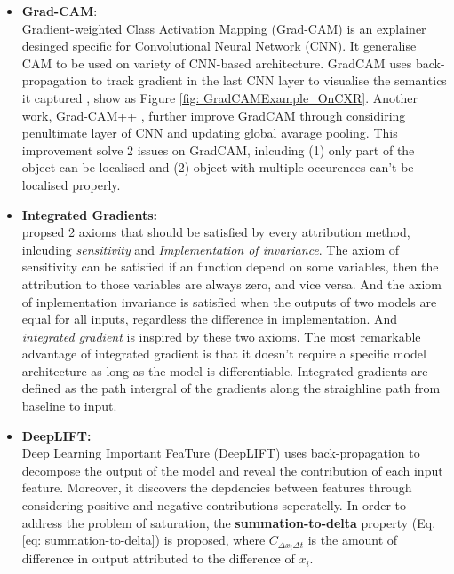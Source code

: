 \begin{itemize}
    \item \textbf{Grad-CAM}: \\ Gradient-weighted Class Activation Mapping (Grad-CAM) is an explainer desinged specific for Convolutional Neural Network (CNN). It generalise CAM \citep{Zhou2015CAM} to be used on variety of CNN-based architecture. GradCAM uses back-propagation to track gradient in the last CNN layer to visualise the semantics it captured \citep{Selvaraju2017GradCAM}, show as Figure \ref{fig: GradCAMExample_OnCXR}. Another work, Grad-CAM++ \citep{Chattopadhay2018GradCAM}, further improve GradCAM through considiring penultimate layer of CNN and updating global avarage pooling. This improvement solve 2 issues on GradCAM, inlcuding (1) only part of the object can be localised and (2) object with multiple occurences can't be localised properly.
    \item \textbf{Integrated Gradients:} \\ \citet{Sundararajan2017IntegratedGradient} propsed 2 axioms that should be satisfied by every attribution method, inlcuding \textit{sensitivity} and \textit{Implementation of invariance}. The axiom of sensitivity can be satisfied if an function depend on some variables, then the attribution to those variables are always zero, and vice versa. And the axiom of inplementation invariance is satisfied when the outputs of two models are equal for all inputs, regardless the difference in implementation. And \textit{integrated gradient} is inspired by these two axioms. The most remarkable advantage of integrated gradient is that it doesn't require a specific model architecture as long as the model is differentiable. Integrated gradients are defined as the path intergral of the gradients along the straighline path from baseline to input.
    \item \textbf{DeepLIFT:} \\ Deep Learning Important FeaTure (DeepLIFT) \citep{Shrikumar2017DeepLIFT} uses back-propagation to decompose the output of the model and reveal the contribution of each input feature. Moreover, it discovers the depdencies between features through considering positive and negative contributions seperatelly. In order to address the problem of saturation, the \textbf{summation-to-delta} property (Eq. \ref{eq: summation-to-delta}) is proposed, where $C_{\Delta x_{i} \Delta t}$ is the amount of difference in output attributed to the difference of $x_{i}$.
\end{itemize}


